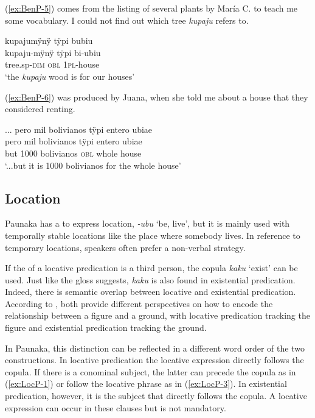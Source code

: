(\ref{ex:BenP-5}) comes from the listing of several plants by María C. to teach me some vocabulary. I could not find out which tree \textit{kupaju} refers to.

\ea\label{ex:BenP-5}
\begingl
\glpreamble kupajumÿnÿ tÿpi bubiu\\
\gla kupaju-mÿnÿ tÿpi bi-ubiu\\
\glb tree.sp-\textsc{dim} \textsc{obl} 1\textsc{pl}-house\\
\glft ‘the \textit{kupaju} wood is for our houses’
\endgl
\trailingcitation{[uxx-p110825l.229]}
\xe

(\ref{ex:BenP-6}) was produced by Juana, when she told me about a house that they considered renting.

\ea\label{ex:BenP-6}
\begingl
\glpreamble ... pero mil bolivianos tÿpi entero ubiae\\
\gla pero mil bolivianos tÿpi entero ubiae\\
\glb but 1000 bolivianos \textsc{obl} whole house\\
\glft ‘...but it is 1000 bolivianos for the whole house’
\endgl
\trailingcitation{[jxx-p120430l-1.365-369]}
\xe


\subsection{Location}\label{sec:LocativePredicates}

Paunaka has a  to express location, \textit{-ubu} ‘be, live’, but it is mainly used with temporally stable locations like the place where somebody lives. In reference to temporary locations, speakers often prefer a non-verbal strategy. 

If the  of a locative predication is a third person, the copula \textit{kaku} ‘exist’ can be used. Just like the gloss suggests, \textit{kaku} is also found in existential predication. Indeed, there is semantic overlap between locative and existential predication. According to \citet[9]{Creissels2014a}, both provide different perspectives on how to encode the relationship between a figure and a ground, with locative predication tracking the figure and existential predication tracking the ground. 

In Paunaka, this distinction can be reflected in a different word order of the two constructions. In locative predication the locative expression directly follows the copula. If there is a conominal subject, the latter can precede the copula as in (\ref{ex:LocP-1}) or follow the locative phrase as in (\ref{ex:LocP-3}). In existential predication, however, it is the subject that directly follows the copula. A locative expression can occur in these clauses but is not mandatory.

